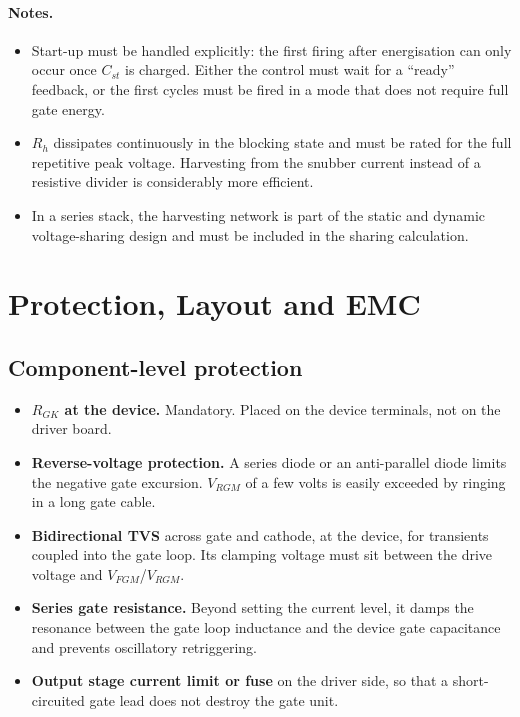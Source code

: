 \documentclass[11pt,a4paper]{article}
\begin{document}
\paragraph{Notes.}
\begin{itemize}
  \item Start-up must be handled explicitly: the first firing after energisation
        can only occur once $C_{st}$ is charged. Either the control must wait for a
        ``ready'' feedback, or the first cycles must be fired in a mode that does
        not require full gate energy.
  \item $R_h$ dissipates continuously in the blocking state and must be rated for
        the full repetitive peak voltage. Harvesting from the snubber current
        instead of a resistive divider is considerably more efficient.
  \item In a series stack, the harvesting network is part of the static and dynamic
        voltage-sharing design and must be included in the sharing calculation.
\end{itemize}

\section{Protection, Layout and EMC}

\subsection{Component-level protection}

\begin{itemize}
  \item \textbf{$R_{GK}$ at the device.} Mandatory. Placed on the device terminals,
        not on the driver board.
  \item \textbf{Reverse-voltage protection.} A series diode or an anti-parallel
        diode limits the negative gate excursion. $V_{RGM}$ of a few volts is
        easily exceeded by ringing in a long gate cable.
  \item \textbf{Bidirectional TVS} across gate and cathode, at the device, for
        transients coupled into the gate loop. Its clamping voltage must sit
        between the drive voltage and $V_{FGM}$/$V_{RGM}$.
  \item \textbf{Series gate resistance.} Beyond setting the current level, it damps
        the resonance between the gate loop inductance and the device gate
        capacitance and prevents oscillatory retriggering.
  \item \textbf{Output stage current limit or fuse} on the driver side, so that a
        short-circuited gate lead does not destroy the gate unit.
\end{itemize}
\end{document}
